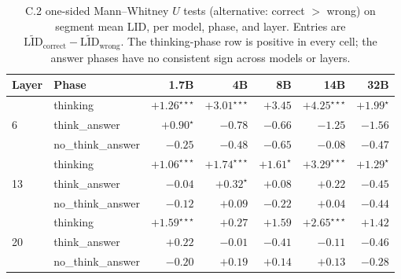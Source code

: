 \documentclass{article}
\theoremstyle{plain}
\theoremstyle{definition}
\theoremstyle{remark}
\begin{document}
\begin{table}[H]
    \centering
    \footnotesize
    \begin{tabular}{llrrrrr}
    \toprule
    Layer & Phase & 1.7B & 4B & 8B & 14B & 32B \\
    \midrule
    \multirow{3}{*}{6}  & thinking         & $+1.26^{\star\star\star}$ & $+3.01^{\star\star\star}$ & $+3.45$                  & $+4.25^{\star\star\star}$ & $+1.99^{\star}$ \\
                       & think\_answer    & $+0.90^{\star}$           & $-0.78$                   & $-0.66$                  & $-1.25$                   & $-1.56$ \\
                       & no\_think\_answer & $-0.25$                   & $-0.48$                   & $-0.65$                  & $-0.08$                   & $-0.47$ \\
    \midrule
    \multirow{3}{*}{13} & thinking         & $+1.06^{\star\star\star}$ & $+1.74^{\star\star\star}$ & $+1.61^{\star}$          & $+3.29^{\star\star\star}$ & $+1.29^{\star}$ \\
                       & think\_answer    & $-0.04$                   & $+0.32^{\star}$           & $+0.08$                  & $+0.22$                   & $-0.45$ \\
                       & no\_think\_answer & $-0.12$                   & $+0.09$                   & $-0.22$                  & $+0.04$                   & $-0.44$ \\
    \midrule
    \multirow{3}{*}{20} & thinking         & $+1.59^{\star\star\star}$ & $+0.27$                   & $+1.59$                  & $+2.65^{\star\star\star}$ & $+1.42$ \\
                       & think\_answer    & $+0.22$                   & $-0.01$                   & $-0.41$                  & $-0.11$                   & $-0.46$ \\
                       & no\_think\_answer & $-0.20$                   & $+0.19$                   & $+0.14$                  & $+0.13$                   & $-0.28$ \\
    \bottomrule
    \end{tabular}
    \caption{C.2 one-sided Mann--Whitney $U$ tests (alternative: correct $>$ wrong) on segment mean LID, per model, phase, and layer. Entries are $\widetilde{\mathrm{LID}}_{\text{correct}}-\widetilde{\mathrm{LID}}_{\text{wrong}}$. The thinking-phase row is positive in every cell; the answer phases have no consistent sign across models or layers.}
    \label{tab:c2-wilcoxon-full}
\end{table}
\end{document}
